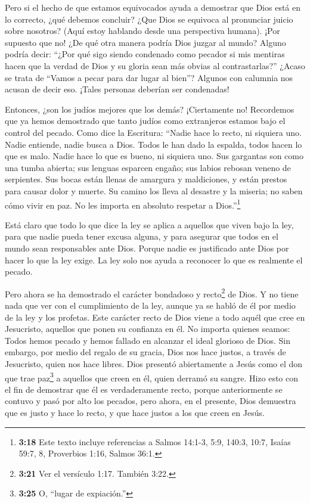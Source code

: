  Pero si el hecho de que estamos equivocados ayuda a
demostrar que Dios está en lo correcto, ¿qué debemos concluir? ¿Que Dios
se equivoca al pronunciar juicio sobre nosotros? (Aquí estoy hablando
desde una perspectiva humana).  ¡Por supuesto que no! ¿De
qué otra manera podría Dios juzgar al mundo?  Alguno podría
decir: ``¿Por qué sigo siendo condenado como pecador si mis mentiras
hacen que la verdad de Dios y su gloria sean más obvias al
contrastarlas?''  ¿Acaso se trata de ``Vamos a pecar para
dar lugar al bien''? Algunos con calumnia nos acusan de decir eso.
¡Tales personas deberían ser condenadas!

 Entonces, ¿son los judíos mejores que los demás?
¡Ciertamente no! Recordemos que ya hemos demostrado que tanto judíos
como extranjeros estamos bajo el control del pecado.  Como
dice la Escritura: ``Nadie hace lo recto, ni siquiera uno. 
Nadie entiende, nadie busca a Dios.  Todos le han dado la
espalda, todos hacen lo que es malo. Nadie hace lo que es bueno, ni
siquiera uno.  Sus gargantas son como una tumba abierta;
sus lenguas esparcen engaño; sus labios rebosan veneno de serpientes.
 Sus bocas están llenas de amargura y maldiciones,
 y están prestos para causar dolor y muerte. 
Su camino los lleva al desastre y la miseria;  no saben
cómo vivir en paz.  No les importa en absoluto respetar a
Dios.''\footnote{\textbf{3:18} Este texto incluye referencias a Salmos
  14:1-3, 5:9, 140:3, 10:7, Isaías 59:7, 8, Proverbios 1:16, Salmos
  36:1.}

 Está claro que todo lo que dice la ley se aplica a
aquellos que viven bajo la ley, para que nadie pueda tener excusa
alguna, y para asegurar que todos en el mundo sean responsables ante
Dios.  Porque nadie es justificado ante Dios por hacer lo
que la ley exige. La ley solo nos ayuda a reconocer lo que es realmente
el pecado.

 Pero ahora se ha demostrado el carácter bondadoso y
recto\footnote{\textbf{3:21} Ver el versículo 1:17. También 3:22.} de
Dios. Y no tiene nada que ver con el cumplimiento de la ley, aunque ya
se habló de él por medio de la ley y los profetas.  Este
carácter recto de Dios viene a todo aquél que cree en Jesucristo,
aquellos que ponen su confianza en él. No importa quienes seamos:
 Todos hemos pecado y hemos fallado en alcanzar el ideal
glorioso de Dios.  Sin embargo, por medio del regalo de su
gracia, Dios nos hace justos, a través de Jesucristo, quien nos hace
libres.  Dios presentó abiertamente a Jesús como el don que
trae paz\footnote{\textbf{3:25} O, ``lugar de expiación.''} a aquellos
que creen en él, quien derramó su sangre. Hizo esto con el fin de
demostrar que él es verdaderamente recto, porque anteriormente se
contuvo y pasó por alto los pecados,  pero ahora, en el
presente, Dios demuestra que es justo y hace lo recto, y que hace justos
a los que creen en Jesús.


